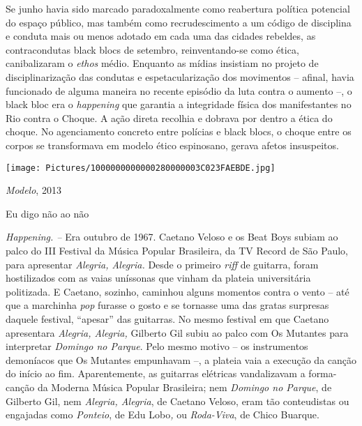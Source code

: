 Se junho havia sido marcado paradoxalmente como reabertura política
potencial do espaço público, mas também como recrudescimento a um código
de disciplina e conduta mais ou menos adotado em cada uma das cidades
rebeldes, as contracondutas black blocs de setembro, reinventando-se
como ética, canibalizaram o \emph{ethos} médio. Enquanto as mídias
insistiam no projeto de disciplinarização das condutas e
espetacularização dos movimentos -- afinal, havia funcionado de alguma
maneira no recente episódio da luta contra o aumento --, o black bloc
era o \emph{happening }que garantia a integridade física dos
manifestantes no Rio contra o Choque. A ação direta recolhia e dobrava
por dentro a ética do choque. No agenciamento concreto entre polícias e
black blocs, o choque entre os corpos se transformava em modelo ético
espinosano, gerava afetos insuspeitos.

\texttt{[image: Pictures/1000000000000280000003C023FAEBDE.jpg]}

\emph{Modelo}, 2013

Eu digo não ao não

\emph{Happening. -- }Era outubro de 1967. Caetano Veloso e os Beat Boys
subiam ao palco do III Festival da Música Popular Brasileira, da TV
Record de São Paulo, para apresentar \emph{Alegria, Alegria. }Desde o
primeiro \emph{riff} de guitarra, foram hostilizados com as vaias
uníssonas que vinham da plateia universitária politizada. E Caetano,
sozinho, caminhou alguns momentos contra o vento -- até que a marchinha
\emph{pop} furasse o gosto e se tornasse uma das gratas surpresas
daquele festival, ``apesar'' das guitarras. No mesmo festival em que
Caetano apresentara \emph{Alegria, Alegria,} Gilberto Gil subiu ao palco
com Os Mutantes para interpretar \emph{Domingo no Parque}. Pelo mesmo
motivo -- os instrumentos demoníacos que Os Mutantes empunhavam --, a
plateia vaia a execução da canção do início ao fim. Aparentemente, as
guitarras elétricas vandalizavam a forma-canção da Moderna Música
Popular Brasileira; nem \emph{Domingo no Parque}, de Gilberto Gil, nem
\emph{Alegria, Alegria}, de Caetano Veloso, eram tão conteudistas ou
engajadas como \emph{Ponteio}, de Edu Lobo\emph{, }ou \emph{Roda-Viva},
de Chico Buarque.

